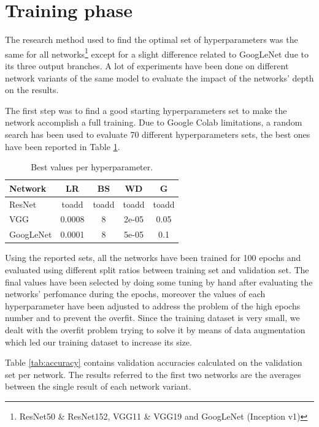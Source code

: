 \documentclass[10pt,twocolumn,letterpaper]{article}
\begin{document}
\section{Training phase}

The research method used to find the optimal set of hyperparameters was the same for all networks\footnote {ResNet50 \& ResNet152, VGG11 \& VGG19 and GoogLeNet (Inception v1)} except for a slight difference related to GoogLeNet due to its three output branches. A lot of experiments have been done on different network variants of the same model to evaluate the impact of the networks' depth on the results.

The first step was to find a good starting hyperparameters set to make the network accomplish a full training. Due to Google Colab limitations, a random search has been used to evaluate 70 different hyperparameters sets, the best ones have been reported in Table \ref{tab:sets}.

\begin{table}
   \begin{center}
   \begin{tabular}{l|c|c|c|c}
   Network & LR & BS & WD & G \\
   \hline
   ResNet & toadd & toadd & toadd & toadd \\
   \hline
   VGG & 0.0008 & 8 & 2e-05 & 0.05 \\
   \hline
   GoogLeNet & 0.0001 & 8 & 5e-05 & 0.1 \\
   \end{tabular}
   \end{center}
   \caption{Best values per hyperparameter.}
   \label{tab:sets}
   \end{table}

Using the reported sets, all the networks have been trained for 100 epochs and evaluated using different split ratios between training set and validation set. The final values have been selected by doing some tuning by hand after evaluating the networks' perfomance during the epochs, moreover the values of each hyperparameter have been adjusted to address the problem of the high epochs number and to prevent the overfit. Since the training dataset is very small, we dealt with the overfit problem trying to solve it by means of data augmentation which led our training dataset to increase its size.

Table \ref{tab:accuracy} contains validation accuracies calculated on the validation set per network. The results referred to the first two networks are the averages between the single result of each network variant. 
\end{document}

